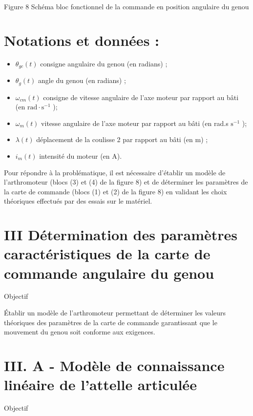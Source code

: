 \documentclass[10pt]{article}
\begin{document}
Figure 8 Schéma bloc fonctionnel de la commande en position angulaire du genou

\section*{Notations et données :}
\begin{itemize}
  \item $\theta_{g c}(t)$ consigne angulaire du genou (en radians) ;

  \item $\theta_{g}(t)$ angle du genou (en radians) ;

  \item $\omega_{c m}(t)$ consigne de vitesse angulaire de l'axe moteur par rapport au bâti (en $\mathrm{rad} \cdot \mathrm{s}^{-1}$ );

  \item $\omega_{m}(t)$ vitesse angulaire de l'axe moteur par rapport au bâti (en rad.s $\mathrm{s}^{-1}$ );

  \item $\lambda(t)$ déplacement de la coulisse 2 par rapport au bâti (en m) ;

  \item $i_{m}(t)$ intensité du moteur (en A).

\end{itemize}

Pour répondre à la problématique, il est nécessaire d'établir un modèle de l'arthromoteur (blocs (3) et (4) de la figure 8) et de déterminer les paramètres de la carte de commande (blocs (1) et (2) de la figure 8) en validant les choix théoriques effectués par des essais sur le matériel.

\section*{III Détermination des paramètres caractéristiques de la carte de commande angulaire du genou}
Objectif

Établir un modèle de l'arthromoteur permettant de déterminer les valeurs théoriques des paramètres de la carte de commande garantissant que le mouvement du genou soit conforme aux exigences.

\section*{III. A - Modèle de connaissance linéaire de l'attelle articulée}
Objectif
\end{document}
